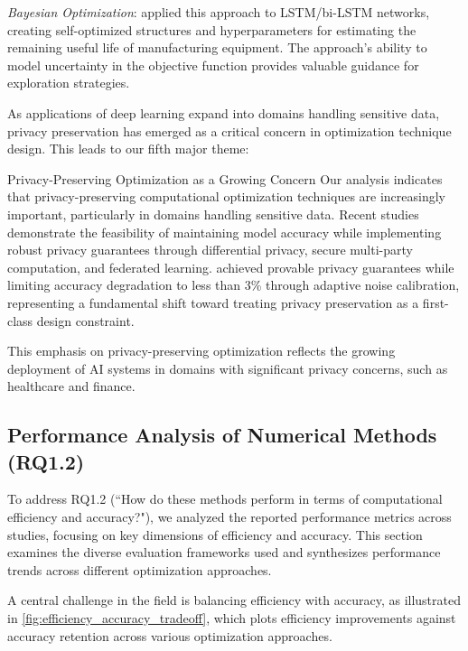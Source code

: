 \documentclass[acmsmall]{acmart}
\begin{document}
\textit{Bayesian Optimization}: \citet{Thoppil2021} applied this approach to LSTM/bi-LSTM networks, creating self-optimized structures and hyperparameters for estimating the remaining useful life of manufacturing equipment. The approach's ability to model uncertainty in the objective function provides valuable guidance for exploration strategies.

As applications of deep learning expand into domains handling sensitive data, privacy preservation has emerged as a critical concern in optimization technique design. This leads to our fifth major theme:

\begin{themebox}{Privacy-Preserving Optimization as a Growing Concern}
    Our analysis indicates that privacy-preserving computational optimization techniques are increasingly important, particularly in domains handling sensitive data. Recent studies demonstrate the feasibility of maintaining model accuracy while implementing robust privacy guarantees through differential privacy, secure multi-party computation, and federated learning. \citet{Zhang20229876} achieved provable privacy guarantees while limiting accuracy degradation to less than 3\% through adaptive noise calibration, representing a fundamental shift toward treating privacy preservation as a first-class design constraint.
\end{themebox}

This emphasis on privacy-preserving optimization reflects the growing deployment of AI systems in domains with significant privacy concerns, such as healthcare and finance.

\subsection{Performance Analysis of Numerical Methods (RQ1.2)}\label{subsec:performance-analysis-of-numerical-methods-rq12}
To address RQ1.2 (``How do these methods perform in terms of computational efficiency and accuracy?"), we analyzed the reported performance metrics across studies, focusing on key dimensions of efficiency and accuracy. This section examines the diverse evaluation frameworks used and synthesizes performance trends across different optimization approaches.

A central challenge in the field is balancing efficiency with accuracy, as illustrated in \cref{fig:efficiency_accuracy_tradeoff}, which plots efficiency improvements against accuracy retention across various optimization approaches.
\end{document}
